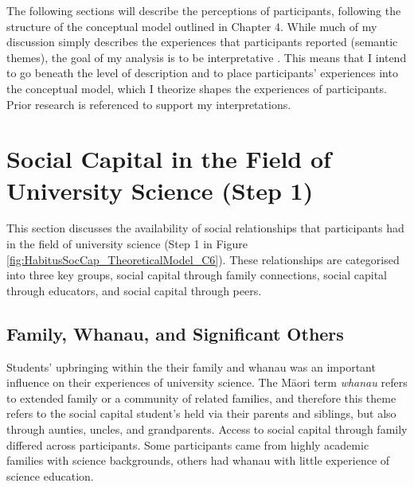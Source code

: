 The following sections will describe the perceptions of participants, following the structure of the conceptual model outlined in Chapter 4. While much of my discussion simply describes the experiences that participants reported (semantic themes), the goal of my analysis is to be interpretative \citep{Braun_2006}. This means that I intend to go beneath the level of description and to place participants' experiences into the conceptual model, which I theorize shapes the experiences of participants. Prior research is referenced to support my interpretations. 

\section{Social Capital in the Field of University Science (Step 1)}
This section discusses the availability of social relationships that participants had in the field of university science (Step 1 in Figure \ref{fig:HabitusSocCap_TheoreticalModel_C6}). These relationships are categorised into three key groups, social capital through family connections, social capital through educators, and social capital through peers. 

\subsection{Family, Whanau, and Significant Others}
Students' upbringing within the their family and whanau was an important influence on their experiences of university science. The M\={a}ori term \textit{whanau} refers to extended family or a community of related families, and therefore this theme refers to the social capital student's held via their parents and siblings, but also through aunties, uncles, and grandparents. Access to social capital through family differed across participants. Some participants came from highly academic families with science backgrounds, others had whanau with little experience of science education. 


